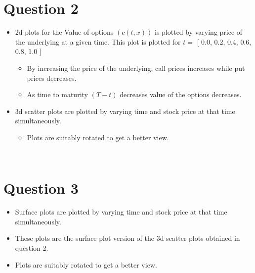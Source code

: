 \documentclass[12pt]{article}
\begin{document}
\section*{Question 2}
\begin{itemize}
\item 2d plots for the Value of options $(c(t,x))$ is plotted by varying price of the underlying at a given time. This plot is plotted for $t =$ [ 0.0, 0.2, 0.4, 0.6, 0.8, 1.0 ]
\begin{itemize}
	\item By increasing the price of the underlying, call prices increases while put prices decreases.
	\item As time to maturity $(T-t)$ decreases value of the options decreases.
\end{itemize}
\item 3d scatter plots are plotted by varying time and stock price at that time simultaneously.
\begin{itemize}
\item Plots are suitably rotated to get a better view.
\end{itemize}

\end{itemize}
\begin{figure}[H]
     \begin{center}
%
        \\ %
    \end{center}
\end{figure}
\vspace{-60pt}
\section*{Question 3}
\begin{itemize}
	\item Surface plots are plotted by varying time and stock price at that time simultaneously.
	\item These plots are the surface plot version of the 3d scatter plots obtained in question 2.
	\item Plots are suitably rotated to get a better view.
\end{itemize}
\end{document}
